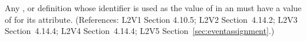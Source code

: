 Any \Compartment, \Species or \Parameter definition whose identifier is
used as the value of  in an \EventAssignment must have a
value of  for its  attribute.  (References: 
L2V1 Section 4.10.5; L2V2 Section~4.14.2; L2V3 Section~4.14.4; L2V4 Section~4.14.4; L2V5 Section~\ref{sec:eventassignment}.)
